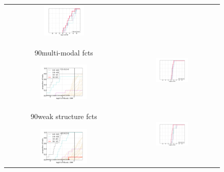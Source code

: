 \documentclass{article}
\newcommand{\rot}[2][2.5]{
  \hspace*{-3.5\baselineskip}%
  \begin{rotate}{90}\hspace{#1em}#2
  \end{rotate}}
\begin{document}
\begin{figure}[htbp!]
\begin{tabular}{@{}c@{}c@{}}
\includegraphics[width=0.3579\textwidth,trim=24mm 7.5mm 16mm 11mm, clip]{ppfvdistr_05D_hcond}
\\[-1ex]
\rot[1.7]{multi-modal fcts}
\includegraphics[width=0.41\textwidth,trim=0 7.5mm 16mm 11mm, clip]{pprldistr_05D_multi} &
\includegraphics[width=0.3579\textwidth,trim=24mm 7.5mm 16mm 11mm, clip]{ppfvdistr_05D_multi}
\\[-1ex]
\rot[1.5]{weak structure fcts}
\includegraphics[width=0.41\textwidth,trim=0 0mm 16mm 11mm, clip]{pprldistr_05D_mult2} &
\includegraphics[width=0.3579\textwidth,trim=24mm 0mm 16mm 11mm, clip]{ppfvdistr_05D_mult2}

\end{tabular}
\end{figure}
\end{document}
